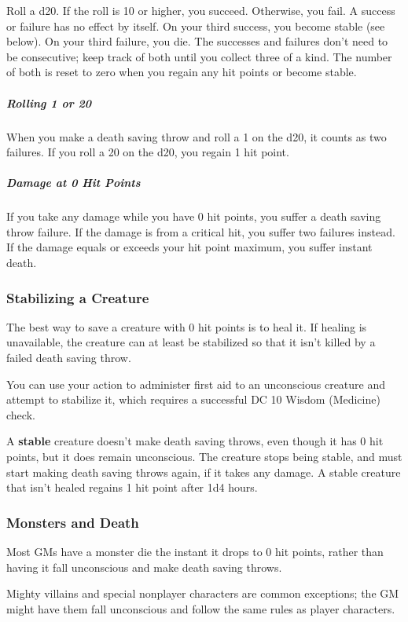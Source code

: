 Roll a d20. If the roll is 10 or higher, you succeed. Otherwise, you fail. A success or failure has no effect by itself. On your third success, you become stable (see below). On your third failure, you die. The successes and failures don't need to be consecutive; keep track of both until you collect three of a kind. The number of both is reset to zero when you regain any hit points or become stable.

\subparagraph*{Rolling 1 or 20} When you make a death saving throw and roll a 1 on the d20, it counts as two failures. If you roll a 20 on the d20, you regain 1 hit point.

\subparagraph*{Damage at 0 Hit Points} If you take any damage while you have 0 hit points, you suffer a death saving throw failure. If the damage is from a critical hit, you suffer two failures instead. If the damage equals or exceeds your hit point maximum, you suffer instant death.

\subsubsection{Stabilizing a Creature}

The best way to save a creature with 0 hit points is to heal it. If healing is unavailable, the creature can at least be stabilized so that it isn't killed by a failed death saving throw.

You can use your action to administer first aid to an unconscious creature and attempt to stabilize it, which requires a successful DC 10 Wisdom (Medicine) check.

A \textbf{stable} creature doesn't make death saving throws, even though it has 0 hit points, but it does remain unconscious. The creature stops being stable, and must start making death saving throws again, if it takes any damage. A stable creature that isn't healed regains 1 hit point after 1d4 hours.

\subsubsection{Monsters and Death}

Most GMs have a monster die the instant it drops to 0 hit points, rather than having it fall unconscious and make death saving throws.

Mighty villains and special nonplayer characters are common exceptions; the GM might have them fall unconscious and follow the same rules as player characters.

